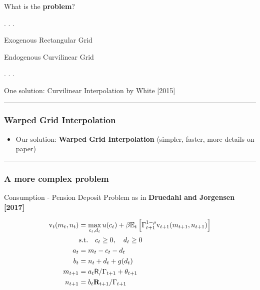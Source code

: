 \documentclass[
  letterpaper,
  DIV=11,
  numbers=noendperiod]{scrartcl}
\providecommand{\tightlist}{%
  \setlength{\itemsep}{0pt}\setlength{\parskip}{0pt}}\usepackage{longtable,booktabs,array}
\begin{document}
What is the \textbf{problem}?

. . .

Exogenous Rectangular Grid

Endogenous Curvilinear Grid

. . .

One solution: Curvilinear Interpolation by White {[}2015{]}

\begin{center}\rule{0.5\linewidth}{0.5pt}\end{center}

\hypertarget{warped-grid-interpolation}{%
\subsubsection{Warped Grid
Interpolation}\label{warped-grid-interpolation}}

\begin{itemize}
\tightlist
\item
  Our solution: \textbf{Warped Grid Interpolation} (simpler, faster,
  more details on paper)
\end{itemize}



\begin{center}\rule{0.5\linewidth}{0.5pt}\end{center}

\hypertarget{a-more-complex-problem}{%
\subsubsection{A more complex problem}\label{a-more-complex-problem}}

Consumption - Pension Deposit Problem as in \textbf{Druedahl and
Jorgensen {[}2017{]}}

\[\begin{equation}
\begin{split}
    \mathrm{v}_{t}(m_{t}, n_{t}) & = \max_{c_{t}, d_{t}} u(c_{t}) + \beta \mathbb{E}_{t} \left[ \Gamma_{t+1}^{1-\rho} \mathrm{v}_{t+1}(m_{t+1}, n_{t+1}) \right] \\
    & \text{s.t.} \quad c_{t} \ge 0, \quad d_{t} \ge 0 \\
    a_{t} & = m_{t} - c_{t} - d_{t} \\
    b_{t} & = n_{t} + d_{t} + g(d_{t}) \\
    m_{t+1} & = a_{t} \mathsf{R} / \Gamma_{t+1}  + \theta_{t+1} \\
    n_{t+1} & = b_{t} \mathbf{R}_{t+1}  / \Gamma_{t+1}
  \end{split}
\end{equation}\]
\end{document}
